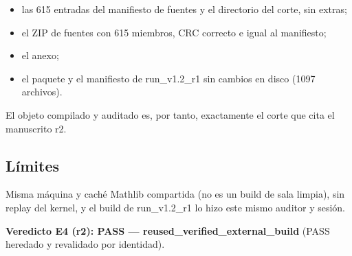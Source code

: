 \documentclass[
]{article}
\providecommand{\tightlist}{%
  \setlength{\itemsep}{0pt}\setlength{\parskip}{0pt}}
\begin{document}
\begin{itemize}
\tightlist
\item
  las 615 entradas del manifiesto de fuentes y el directorio del corte,
  sin extras;
\item
  el ZIP de fuentes con 615 miembros, CRC correcto e igual al
  manifiesto;
\item
  el anexo;
\item
  el paquete y el manifiesto de run\_v1.2\_r1 sin cambios en disco (1097
  archivos).
\end{itemize}

El objeto compilado y auditado es, por tanto, exactamente el corte que
cita el manuscrito r2.

\subsection{Límites}\label{luxedmites}

Misma máquina y caché Mathlib compartida (no es un build de sala
limpia), sin replay del kernel, y el build de run\_v1.2\_r1 lo hizo este
mismo auditor y sesión.

\textbf{Veredicto E4 (r2): PASS --- reused\_verified\_external\_build}
(PASS heredado y revalidado por identidad).
\end{document}
